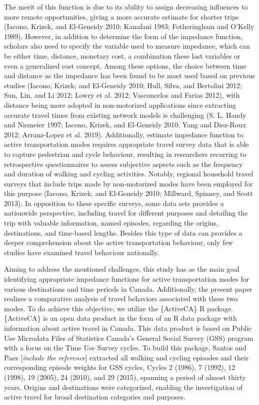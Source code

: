 \documentclass[preprint, 3p,
authoryear]{elsarticle} %
\begin{document}
The merit of this function is due to its ability to assign decreasing
influences to more remote opportunities, giving a more accurate estimate
for shorter trips (Iacono, Krizek, and El-Geneidy 2010; Kanafani 1983;
Fotheringham and O'Kelly 1989). However, in addition to determine the
form of the impedance function, scholars also need to specify the
variable used to measure impedance, which can be either time, distance,
monetary cost, a combination these last variables or even a generalized
cost concept. Among these options, the choice between time and distance
as the impedance has been found to be most used based on previous
studies (Iacono, Krizek, and El-Geneidy 2010; Hull, Silva, and Bertolini
2012; Sun, Lin, and Li 2012; Lowry et al. 2012; Vasconcelos and Farias
2012), with distance being more adopted in non-motorized applications
since extracting accurate travel times from existing network models is
challenging (S. L. Handy and Niemeier 1997; Iacono, Krizek, and
El-Geneidy 2010; Yang and Diez-Roux 2012; Arranz-Lopez et al. 2019).
Additionally, estimate impedance function to active transportation modes
requires appropriate travel survey data that is able to capture
pedestrian and cycle behaviour, resulting in researchers recurring to
retrospective questionnaires to assess subjective aspects such as the
frequency and duration of walking and cycling activities. Notably,
regional household travel surveys that include trips made by
non-motorized modes have been employed for this purpose (Iacono, Krizek,
and El-Geneidy 2010; Millward, Spinney, and Scott 2013). In opposition
to these specific surveys, some data sets provides a nationwide
perspective, including travel for different purposes and detailing the
trip with valuable information, named episodes, regarding the origins,
destinations, and time-based lengths. Besides this type of data can
provides a deeper comprehension about the active transportation
behaviour, only few studies have examined travel behaviour nationally.

Aiming to address the mentioned challenges, this study has as the main
goal identifying appropriate impedance functions for active
transportation modes for various destinations and time periods in
Canada. Additionally, the present paper realizes a comparative analysis
of travel behaviors associated with these two modes. To do achieve this
objective, we utilize the \{ActiveCA\} R package. \{ActiveCA\} is an
open data product in the form of an R data package with information
about active travel in Canada. This data product is based on Public Use
Microdata Files of Statistics Canada's General Social Survey (GSS)
program with a focus on the Time Use Survey cycles. To build this
package, Santos and Paez {[}\emph{include the reference}{]} extracted
all walking and cycling episodes and their corresponding episode weights
for GSS cycles, Cycles 2 (1986), 7 (1992), 12 (1998), 19 (2005), 24
(2010), and 29 (2015), spanning a period of almost thirty years. Origins
and destinations were categorized, enabling the investigation of active
travel for broad destination categories and purposes.
\end{document}
